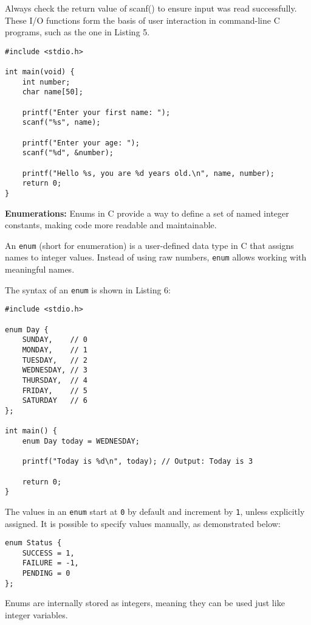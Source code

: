 \documentclass[a4paper,12pt]{article}
\begin{document}
Always check the return value of scanf() to ensure input was read successfully.
These I/O functions form the basis of user interaction in command-line C programs, such as the one in Listing 5.

\begin{lstlisting}[caption=I/O in C]
#include <stdio.h>

int main(void) {
    int number;
    char name[50];

    printf("Enter your first name: ");
    scanf("%s", name);

    printf("Enter your age: ");
    scanf("%d", &number);

    printf("Hello %s, you are %d years old.\n", name, number);
    return 0;
}\end{lstlisting}

\hrulefill

\newpage

\textbf{Enumerations:} Enums in C provide a way to define a set of named integer constants, making code more readable and maintainable.

An \texttt{enum} (short for enumeration) is a user-defined data type in C that assigns names to integer values. Instead of using raw numbers, \texttt{enum} allows working with meaningful names.

The syntax of an \texttt{enum} is shown in Listing 6:

\begin{lstlisting}[caption=ENUM usage example]
#include <stdio.h>

enum Day {
    SUNDAY,    // 0
    MONDAY,    // 1
    TUESDAY,   // 2
    WEDNESDAY, // 3
    THURSDAY,  // 4
    FRIDAY,    // 5
    SATURDAY   // 6
};

int main() {
    enum Day today = WEDNESDAY;

    printf("Today is %d\n", today); // Output: Today is 3

    return 0;
}\end{lstlisting}


The values in an \texttt{enum} start at \texttt{0} by default and increment by \texttt{1}, unless explicitly assigned. It is possible to specify values manually, as demonstrated below:

\begin{Verbatim}[fontsize=\small]
enum Status {
    SUCCESS = 1,
    FAILURE = -1,
    PENDING = 0
};\end{Verbatim}

Enums are internally stored as integers, meaning they can be used just like integer variables.
\end{document}

